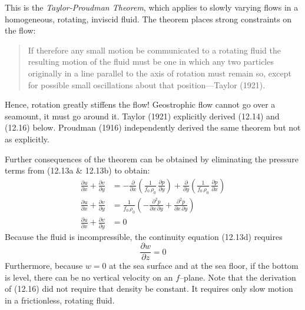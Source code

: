 This is the \textit{Taylor-Proudman Theorem}, which applies to slowly varying
flows in a homogeneous, rotating, inviscid fluid. The theorem places strong constraints on the flow:
\begin{quotation} \small
If therefore any small motion be communicated to a rotating fluid the resulting
motion of the fluid must be one in which any two particles originally in a line
parallel to the axis of rotation must remain so, except for possible small
oscillations about that position---Taylor (1921).
\end{quotation}
Hence, rotation greatly stiffens the flow! Geostrophic flow cannot go over a seamount, it must go around it. Taylor (1921)
explicitly derived (12.14) and (12.16) below. Proudman (1916) independently derived the same
theorem but not as explicitly.

Further consequences of the theorem can be obtained by eliminating the pressure
terms from (12.13a \& 12.13b) to obtain:
\begin{subequations}
\begin{align}
\frac{\partial{u}}{\partial{x}} + \frac{\partial{v}}{\partial{y}} &= -\frac{\partial }{\partial{x}} \left(\frac{1}{f_{0}\,\rho_{0}}\,
\frac{\partial{p}}{\partial{y}} \right) + \frac{\partial }{\partial{y}} \left(\frac{1}{f_{0}\,\rho_{0}}\,
\frac{\partial{p}}{\partial{x}} \right) \\
\frac{\partial{u}}{\partial{x}} + \frac{\partial{v}}{\partial{y}} &= \frac{1}{f_{0}\,\rho_{0}} \left( -\frac{\partial ^2 p}{\partial{x}\,\partial{y}} + \frac{\partial ^2
p}{\partial{x}\,\partial{y}} \right)  \\
\frac{\partial{u}}{\partial{x}} + \frac{\partial{v}}{\partial{y}} &= 0
\end{align}
\end{subequations}
Because the fluid is incompressible, the continuity equation (12.13d) requires
\begin{equation}
\frac{\partial{w}}{\partial{z}} = 0
\end{equation}
Furthermore, because $w = 0$ at the sea surface and at the sea floor, if the bottom
is level, there can be no vertical velocity on an $f$--plane. Note that the
derivation of (12.16) did not require that density be constant. It requires only
slow motion in a frictionless, rotating fluid.

